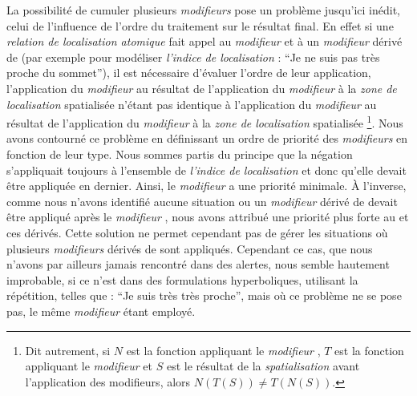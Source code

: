La possibilité de cumuler plusieurs \emph{modifieurs} pose un problème
jusqu'ici inédit, celui de l'influence de l'ordre du traitement sur le
résultat final. En effet si une \emph{relation de localisation
  atomique} fait appel au \emph{modifieur}  et à un
\emph{modifieur} dérivé de  (par exemple pour
modéliser \emph{l'indice de localisation} : \enquote{Je ne suis pas
  très proche du sommet}), il est nécessaire d'évaluer l'ordre de leur
application, l’application du \emph{modifieur}  au résultat
de l'application du \emph{modifieur}  à la \emph{zone de
  localisation} spatialisée n'étant pas identique à l'application du
\emph{modifieur}  au résultat de l’application du
\emph{modifieur}  à la \emph{zone de localisation}
spatialisée \footnote{Dit autrement, si \(N\) est la fonction
  appliquant le \emph{modifieur} , \(T\) est la fonction
  appliquant le \emph{modifieur}  et \(S\) est le résultat
  de la \emph{spatialisation} avant l'application des modifieurs,
  alors \(N(T(S)) \neq T(N(S))\).}. Nous avons contourné ce problème
en définissant un ordre de priorité des \emph{modifieurs} en fonction
de leur type. Nous sommes partis du principe que la négation
s'appliquait toujours à l'ensemble de \emph{l'indice de localisation}
et donc qu'elle devait être appliquée en dernier. Ainsi, le
\emph{modifieur}  a une priorité minimale. À l'inverse,
comme nous n'avons identifié aucune situation ou un \emph{modifieur}
dérivé de  devait être appliqué après le
\emph{modifieur} , nous avons attribué une priorité plus
forte au  et ces dérivés. Cette solution ne permet
cependant pas de gérer les situations où plusieurs \emph{modifieurs}
dérivés de  sont appliqués. Cependant ce cas, que
nous n'avons par ailleurs jamais rencontré dans des alertes, nous
semble hautement improbable, si ce n'est dans des formulations
hyperboliques, utilisant la répétition, telles que : \enquote{Je suis
  très très proche}, mais où ce problème ne se pose pas, le même
\emph{modifieur} étant employé.

